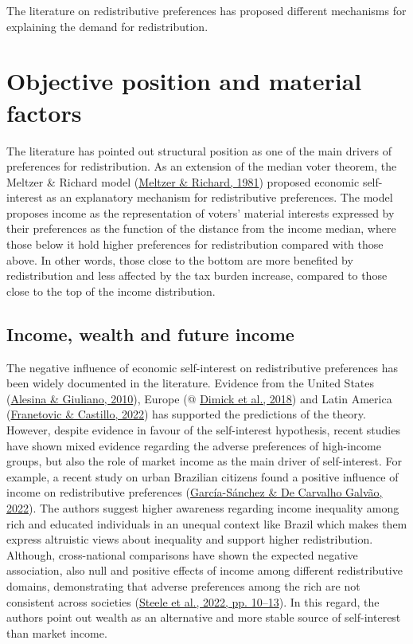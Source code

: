 \documentclass[
  12pt,
]{book}
\begin{document}
The literature on redistributive preferences has proposed different mechanisms for explaining the demand for redistribution.

\hypertarget{objective-position-and-material-factors}{%
\chapter{Objective position and material factors}\label{objective-position-and-material-factors}}

The literature has pointed out structural position as one of the main drivers of preferences for redistribution. As an extension of the median voter theorem, the Meltzer \& Richard model (\protect\hyperlink{ref-Meltzer81}{Meltzer \& Richard, 1981}) proposed economic self-interest as an explanatory mechanism for redistributive preferences. The model proposes income as the representation of voters' material interests expressed by their preferences as the function of the distance from the income median, where those below it hold higher preferences for redistribution compared with those above. In other words, those close to the bottom are more benefited by redistribution and less affected by the tax burden increase, compared to those close to the top of the income distribution.

\hypertarget{income-wealth-and-future-income}{%
\section{Income, wealth and future income}\label{income-wealth-and-future-income}}

The negative influence of economic self-interest on redistributive preferences has been widely documented in the literature. Evidence from the United States (\protect\hyperlink{ref-alesina_preferences_2010}{Alesina \& Giuliano, 2010}), Europe (@ \protect\hyperlink{ref-dimick_models_2018}{Dimick et al., 2018}) and Latin America (\protect\hyperlink{ref-franetovic_preferences_2022}{Franetovic \& Castillo, 2022}) has supported the predictions of the theory. However, despite evidence in favour of the self-interest hypothesis, recent studies have shown mixed evidence regarding the adverse preferences of high-income groups, but also the role of market income as the main driver of self-interest. For example, a recent study on urban Brazilian citizens found a positive influence of income on redistributive preferences (\protect\hyperlink{ref-garcia-sanchez_creencias_2022}{García-Sánchez \& De Carvalho Galvão, 2022}). The authors suggest higher awareness regarding income inequality among rich and educated individuals in an unequal context like Brazil which makes them express altruistic views about inequality and support higher redistribution. Although, cross-national comparisons have shown the expected negative association, also null and positive effects of income among different redistributive domains, demonstrating that adverse preferences among the rich are not consistent across societies (\protect\hyperlink{ref-steele_wealth_2022}{Steele et al., 2022, pp. 10--13}). In this regard, the authors point out wealth as an alternative and more stable source of self-interest than market income.
\end{document}
